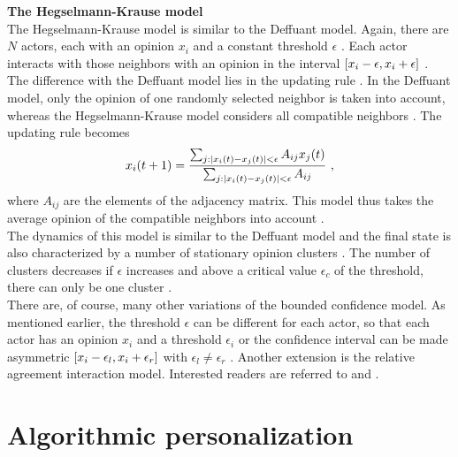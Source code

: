 \documentclass[11 pt , letterpaper , twoside , openright]{book}
\begin{document}
\newline
\textbf{The Hegselmann-Krause model}\\
\newline
The Hegselmann-Krause model is similar to the Deffuant model. Again, there are $N$ actors, each with an opinion $x_i$ and a constant threshold $\epsilon$ \cite{Castellano2009}. Each actor interacts with those neighbors with an opinion in the interval $\interval{x_i-\epsilon}{x_i+\epsilon}$ \cite{Castellano2009}. The difference with the Deffuant model lies in the updating rule \cite{Castellano2009}. In the Deffuant model, only the opinion of one randomly selected neighbor is taken into account, whereas the Hegselmann-Krause model considers all compatible neighbors \cite{Castellano2009}. The updating rule becomes \cite{Castellano2009}
\begin{equation}
	x_i(t+1) = \frac{\sum_{j:\abs{x_i(t) - x_j(t)}<\epsilon}A_{ij}x_j(t)}{\sum_{j:\abs{x_i(t) - x_j(t)}<\epsilon}A_{ij}} \ ,
\end{equation}
where $A_{ij}$ are the elements of the adjacency matrix. This model thus takes the average opinion of the compatible neighbors into account \cite{Castellano2009}.\\
\newline
The dynamics of this model is similar to the Deffuant model and the final state is also characterized by a number of stationary opinion clusters \cite{Castellano2009}. The number of clusters decreases if $\epsilon$ increases and above a critical value $\epsilon_c$ of the threshold, there can only be one cluster \cite{Castellano2009}.\\
\newline
There are, of course, many other variations of the bounded confidence model. As mentioned earlier, the threshold $\epsilon$ can be different for each actor, so that each actor has an opinion $x_i$ and a threshold $\epsilon_i$ or the confidence interval can be made asymmetric $\interval{x_i - \epsilon_l}{x_i + \epsilon_r}$ with $\epsilon_l \neq
\epsilon_r$ \cite{Krause2002}. Another extension is the relative agreement interaction model. Interested readers are referred to \cite{Deffuant2006} and \cite{Deffuant2002}.

\section{Algorithmic personalization}\label{filter}
\end{document}

